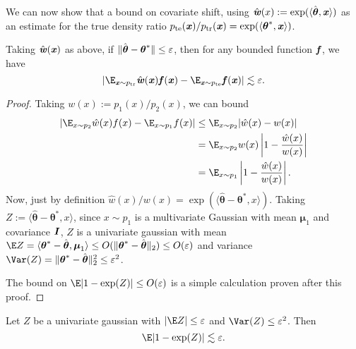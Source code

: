 We can now show that a bound on covariate shift, using $\hat{\boldsymbol{\mathit{w}}}(x) := \exp(\langle \hat{\boldsymbol{\mathit{\theta}}}, \boldsymbol{\mathit{x}} \rangle)$ as an estimate for the true density ratio $p_{\mathrm{te}}(\boldsymbol{\mathit{x}})/p_{\mathrm{tr}}(\boldsymbol{\mathit{x}}) = \exp(\langle \boldsymbol{\mathit{\theta}}^*, \boldsymbol{\mathit{x}} \rangle)$.

\begin{lemma}
    Taking $\hat{\boldsymbol{\mathit{w}}}(\boldsymbol{\mathit{x}})$ as above, if $\|\hat{\boldsymbol{\mathit{\theta}}} - \boldsymbol{\mathit{\theta}}^*\| \leq \varepsilon$, then for any bounded function $\boldsymbol{\mathit{f}}$, we have
    \begin{equation*}
        | \E_{\xx\sim \ptr} \hat{\ww}(\xx) \ff(\xx) - \E_{\xx\sim \pte} \ff(\xx)| \lesssim \varepsilon.
    \end{equation*}
\end{lemma}
\begin{proof}
    Taking $w(x) := p_1(x)/p_2(x)$, we can bound 
    \begin{align*}
        | \E_{x\sim p_2} \hat{w}(x) f(x) - \E_{x\sim p_1} f(x)| 
        & \leq \E_{x\sim p_2} |\hat{w}(x) - w(x)|  \\
        & = \E_{x\sim p_2} w(x) \left|1 - \frac{\hat{w}(x)}{w(x)}\right| \\
        & = \E_{x\sim p_1} \left| 1 - \frac{\hat{w}(x)}{w(x)}\right|.
    \end{align*}
    Now, just by definition $\hat{w}(x) / w(x) = \exp(\langle \hat{\boldsymbol{\theta}} - \boldsymbol{\theta}^*, x\rangle)$. Taking $Z := \langle \hat{\boldsymbol{\theta}} - \boldsymbol{\theta}^*, x \rangle$, since $x\sim p_1$ is a multivariate Gaussian with mean $\boldsymbol{\mu}_1$ and covariance $\boldsymbol{\mathit{I}}$, $Z$ is a univariate gaussian with mean $\E Z = \langle \boldsymbol{\theta}^* - \hat{\boldsymbol{\theta}}, \boldsymbol{\mu}_1\rangle \leq O(\|\boldsymbol{\theta}^* - \hat{\boldsymbol{\theta}}\|_2) \leq O(\varepsilon)$ and variance $\Var(Z) = \|\boldsymbol{\theta}^* - \hat{\boldsymbol{\theta}}\|_2^2 \leq \varepsilon^2$.

    The bound on $\E |1 - \exp(Z)| \leq O(\varepsilon)$ is a simple calculation proven after this proof.
\end{proof}
\begin{lemma}
\label{lem:abs_one_minus_mgf}
    Let $Z$ be a univariate gaussian with $| \E Z | \leq \varepsilon$ and $\Var(Z) \leq \varepsilon^2$. Then
    \begin{equation*}
        \E |1 - \exp(Z)| \lesssim \varepsilon.
    \end{equation*}
\end{lemma}
